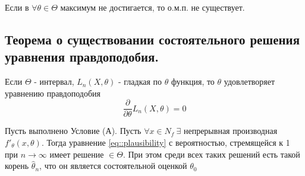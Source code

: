 Если в \(\forall\theta\in\Theta\) максимум не достигается, то о.м.п. не существует.

\subsection{Теорема о существовании состоятельного решения уравнения правдоподобия.}

Если \(\Theta\) - интервал, \(L_n(X, \theta)\) - гладкая по \(\theta\) функция,
то \(\theta\) удовлетворяет уравнению правдоподобия
\begin{equation} \label{eq::plausibility}
    \frac{\partial}{\partial\theta}L_n(X, \theta) = 0
\end{equation}
\begin{theorem}
    \label{th::consist_plausibility}
    Пусть выполнено Условие (А). Пусть \(\forall x \in N_f \ \exists\) непрерывная
    производная \(f'_{\theta}(x, \theta)\). Тогда уравнение \eqref{eq::plausibility}
    с вероятностью, стремящейся к 1 при \(n\rightarrow \infty\) имеет решение \(\in\Theta\).
    При этом среди всех таких решений есть такой корень \(\widehat{\theta}_n\), что он
    является состоятельной оценкой \(\theta_0\)
\end{theorem}
